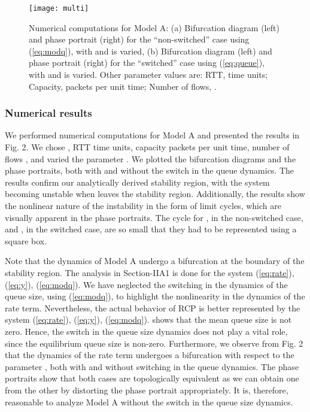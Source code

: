 \documentclass[conference]{IEEEtran}
\begin{document}
\begin{figure*}
\centering
{}



\texttt{[image: multi]}
\caption{Numerical computations for Model A: (a) Bifurcation diagram (left) and phase portrait 
(right) for the ``non-switched'' case using (\ref{eq:modq}), with  and  is varied, (b) Bifurcation diagram 
(left) and phase portrait (right) for the ``switched'' case using (\ref{eq:queue}), with  and  is 
varied. Other parameter values are: RTT,  time units; Capacity,  packets per 
unit time; Number of flows, .}
\label{multiplot}
\end{figure*}

\subsubsection{Numerical results}
We performed numerical computations for Model A and presented the results in Fig. 2.
We chose , RTT  time units,
capacity  packets per unit time, number of flows , and varied the parameter . We plotted the bifurcation
diagrams and the phase portraits, both with and without the switch in the queue dynamics. The results confirm our analytically derived stability region, with the system becoming unstable when  leaves the stability region. Additionally, the results show the nonlinear nature of the instability in the form of limit cycles, which are visually apparent in the phase portraits. The cycle for , in the non-switched case, and
, in the switched case, are so small that they had to be represented using a square box.

Note that the dynamics of Model A undergo a bifurcation at the boundary of the stability region.
The analysis in Section-IIA1 is done for the system (\ref{eq:rate}), (\ref{eq:y}), (\ref{eq:modq}).
We have neglected the switching in the dynamics of the queue size, using (\ref{eq:modq}), to highlight the nonlinearity in the
dynamics of the rate term. Nevertheless, the actual behavior of RCP is better
represented by the system (\ref{eq:rate}), (\ref{eq:y}), (\ref{eq:modq}). \cite[Fig.~5]{krv}
shows that the mean queue size is not zero.    
Hence, the switch in the queue size dynamics does not play a vital role, since the equilibrium queue size is non-zero.
Furthermore, we observe from Fig. 2 that the dynamics of the rate term undergoes a bifurcation with respect to the parameter , both with and without switching in the queue dynamics. The phase
portraits show that both cases are topologically equivalent as we can
obtain one from the other by distorting the phase portrait appropriately. It is,
therefore, reasonable to analyze Model A without the switch in the queue size dynamics.
\end{document}
